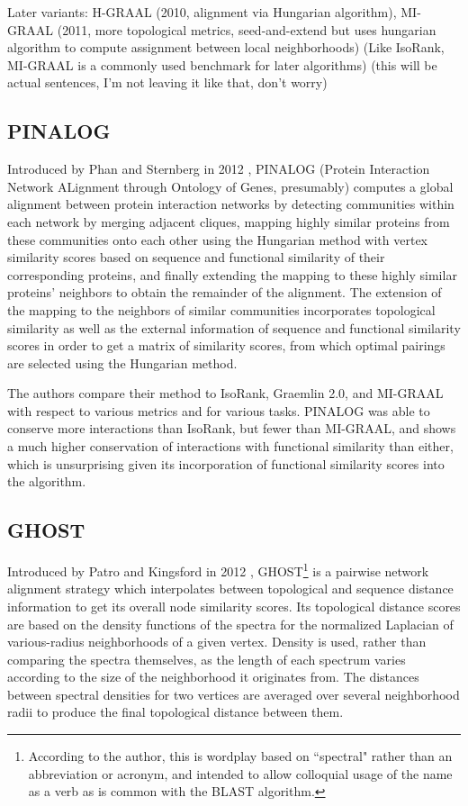 \documentclass[12pt]{thesis}
\theoremstyle{plain}
\theoremstyle{definition}
\theoremstyle{remark}
\begin{document}
Later variants: H-GRAAL (2010, alignment via Hungarian algorithm), MI-GRAAL (2011, more topological metrics, seed-and-extend but uses hungarian algorithm to compute assignment between local neighborhoods) (Like IsoRank, MI-GRAAL is a commonly used benchmark for later algorithms) (this will be actual sentences, I'm not leaving it like that, don't worry)

\subsection{PINALOG}

Introduced by Phan and Sternberg in 2012 \cite{phan2012pinalog}, PINALOG (Protein Interaction Network ALignment through Ontology of Genes, presumably) computes a global alignment between protein interaction networks by detecting communities within each network by merging adjacent cliques, mapping highly similar proteins from these communities onto each other using the Hungarian method with vertex similarity scores based on sequence and functional similarity of their corresponding proteins, and finally extending the mapping to these highly similar proteins' neighbors to obtain the remainder of the alignment. The extension of the mapping to the neighbors of similar communities incorporates topological similarity as well as the external information of sequence and functional similarity scores in order to get a matrix of similarity scores, from which optimal pairings are selected using the Hungarian method.

The authors compare their method to IsoRank, Graemlin 2.0, and MI-GRAAL with respect to various metrics and for various tasks. PINALOG was able to conserve more interactions than IsoRank, but fewer than MI-GRAAL, and shows a much higher conservation of interactions with functional similarity than either, which is unsurprising given its incorporation of functional similarity scores into the algorithm. 

\subsection{GHOST}

Introduced by Patro and Kingsford in 2012 \cite{Patro_2012}, GHOST\footnote{According to the author, this is wordplay based on ``spectral" rather than an abbreviation or acronym, and intended to allow colloquial usage of the name as a verb as is common with the BLAST algorithm.}  is a pairwise network alignment strategy which interpolates between topological and sequence distance information to get its overall node similarity scores. Its topological distance scores are based on the density functions of the spectra for the normalized Laplacian of various-radius neighborhoods of a given vertex. Density is used, rather than comparing the spectra themselves, as the length of each spectrum varies according to the size of the neighborhood it originates from. The distances between spectral densities for two vertices are averaged over several neighborhood radii to produce the final topological distance between them.
\end{document}
